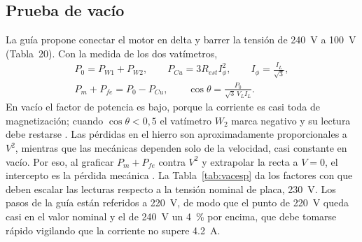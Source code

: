 \documentclass[conference]{IEEEtran}
\begin{document}
\begin{table}[!t]
\centering
\caption{Tabla propuesta para registrar la puesta en operación}
\label{tab:regop}
\scriptsize
\setlength{\tabcolsep}{2.5pt}
\end{table}

\subsection{Prueba de vacío}
La guía propone conectar el motor en delta y barrer la tensión de \SI{240}{V} a \SI{100}{V} (Tabla~20). Con la medida de los dos vatímetros,
\begin{gather}
P_0=P_{W1}+P_{W2},\qquad P_{Cu}=3R_{est}I_\phi^2,\qquad I_\phi=\frac{I_L}{\sqrt3},\label{eq:p0}\\
P_m+P_{fe}=P_0-P_{Cu},\qquad \cos\theta=\frac{P_0}{\sqrt3\,V_LI_L}.\label{eq:pmfe}
\end{gather}
En vacío el factor de potencia es bajo, porque la corriente es casi toda de magnetización; cuando $\cos\theta<0{,}5$ el vatímetro $W_2$ marca negativo y su lectura debe restarse \cite{fraile}. Las pérdidas en el hierro son aproximadamente proporcionales a $V^2$, mientras que las mecánicas dependen solo de la velocidad, casi constante en vacío. Por eso, al graficar $P_m+P_{fe}$ contra $V^2$ y extrapolar la recta a $V=0$, el intercepto es la pérdida mecánica \cite{ieee112}. La Tabla~\ref{tab:vacesp} da los factores con que deben escalar las lecturas respecto a la tensión nominal de placa, \SI{230}{V}. Los pasos de la guía están referidos a \SI{220}{V}, de modo que el punto de \SI{220}{V} queda casi en el valor nominal y el de \SI{240}{V} un \SI{4}{\percent} por encima, que debe tomarse rápido vigilando que la corriente no supere \SI{4,2}{A}.
\end{document}
